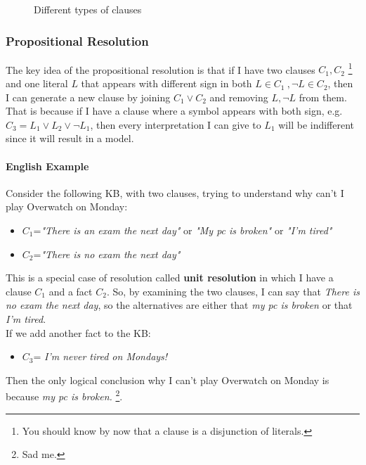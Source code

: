 \documentclass[10pt,a4paper]{article}
\begin{document}
\begin{figure}[H]
\centering
{}
\caption{Different types of clauses}
\label{fig:clauses}
\end{figure}

\subsubsection{Propositional Resolution }
\label{subsubsec:prop_resolution}
The key idea of the propositional resolution is that if I have two clauses $C_1,C_2$ \footnote{You should know by now that a clause is a disjunction of literals.} and one literal $L$ that appears with different sign in both $L \in C_1\ ,\neg L \in C_2$, then I can generate a new clause by joining $C_1 \vee C_2$ and removing $L,\neg L$ from them. That is because if I have a clause where a symbol appears with both sign, e.g. $C_3=L_1 \vee L_2 \vee \neg L_1$, then every interpretation I can give to $L_1$ will be indifferent since it will result in a model. 

\paragraph{English Example} Consider the following KB, with two clauses, trying to understand why can't I play Overwatch on Monday:
\begin{itemize}
\item $C_1$=\textit{"There is an exam the next day"} or \textit{"My pc is broken"} or \textit{"I'm tired"}
\item $C_2$=\textit{"There is no exam the next day"}
\end{itemize}
This is a special case of resolution called \textbf{unit resolution} in which I have a clause $C_1$ and a fact $C_2$. So, by examining the two clauses, I can say that \textit{There is no exam the next day}, so the alternatives are either that \textit{my pc is broken} or that \textit{I'm tired}.\\
If we add another fact to the KB:
\begin{itemize}
\item $C_3$= \textit{I'm never tired on Mondays!}
\end{itemize}
Then the only logical conclusion why I can't play Overwatch on Monday is because \textit{my pc is broken.} \footnote{Sad me.}.
\end{document}
